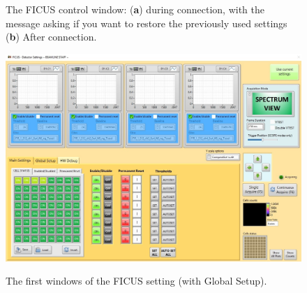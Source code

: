 \documentclass[a4paper,12pt,oneside,pdflatex,italian,final,twocolumn]{article}
\begin{document}
\begin{figure}[h]
\caption{The FICUS control window: (\textbf{a}) during connection, with the message asking if you want to restore the previously used settings (\textbf{b}) After connection.}\label{fig:fig35}
\end{figure}


\begin{figure}[h!]
\centering
{\includegraphics[width=.95\textwidth]{Capture57.jpg}} \quad
\caption{The first windows of the FICUS setting (with Global Setup).}\label{fig:fig36}
\end{figure}
\end{document}
